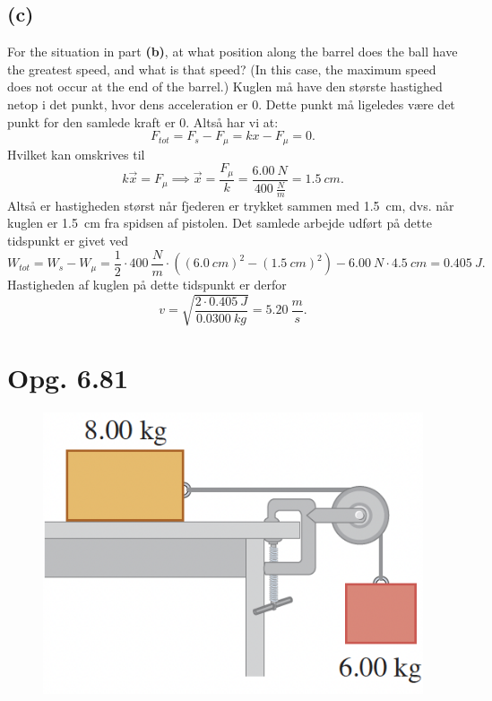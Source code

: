 \documentclass[12pt]{article}
\begin{document}
\subsection*{(c)}
For the situation in part \textbf{(b)}, at what position along the barrel does the ball have the greatest speed, and what is that speed? (In this case, the maximum speed does not occur at the end of the barrel.)
\bigbreak
Kuglen må have den største hastighed netop i det punkt, hvor dens acceleration er 0. Dette punkt må ligeledes være det punkt for den samlede kraft er 0. Altså har vi at:
\[
F_{tot} = F_s - F_\mu = kx - F_\mu = 0
.\] 
Hvilket kan omskrives til
\[
k\Vec{x} = F_\mu \implies \Vec{x} = \frac{F_\mu}{k} = \frac{\qty{6,00}{N}}{\qty{400}{\frac{N}{m}}} = \qty{1,5}{cm}
.\] 
Altså er hastigheden størst når fjederen er trykket sammen med \qty{1,5}{cm}, dvs. når kuglen er \qty{1,5}{cm} fra spidsen af pistolen. Det samlede arbejde udført på dette tidspunkt er givet ved
\[
W_{tot} = W_s - W_\mu = \frac{1}{2}\cdot \qty{400}{\frac{N}{m}} \cdot \left( \left( \qty{6,0}{cm} \right)^2 - \left( \qty{1,5}{cm} \right)^2  \right) - \qty{6,00}{N}\cdot \qty{4,5}{cm} = \qty{0,405}{J}
.\] 
Hastigheden af kuglen på dette tidspunkt er derfor
\[
v = \sqrt{\frac{2\cdot \qty{0,405}{J}}{\qty{0,0300}{kg}}} = \qty{5,20}{\frac{m}{s}}
.\] 



\section*{Opg. 6.81}

\begin{figure} [ht]
  \centering
  \caption{}
  \includegraphics[width=0.5\linewidth]{../figures/P6_81.png}
  \label{fig:P6_81}
\end{figure}
\end{document}
